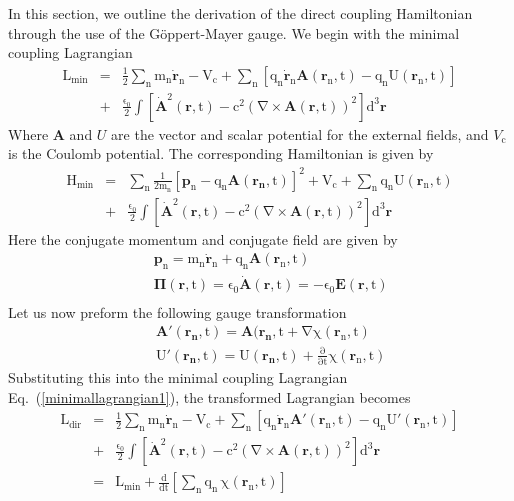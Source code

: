 In this section, we outline the derivation of the direct coupling Hamiltonian through the use of the G\"{o}ppert-Mayer gauge.  We begin with the minimal coupling Lagrangian
\begin{eqnarray}
\mathrm{L_{min}}&=&\mathrm{\frac{1}{2}\sum_n m_n\dot{\mathbf{r}}_n-V_c+\sum_n\left[q_n\dot{\mathbf{r}}_n\mathbf{A}(\mathbf{r}_n,t)-q_nU(\mathbf{r}_n,t)\right]} \nonumber \\
&+&\mathrm{\frac{\epsilon_0}{2}\int\left[\dot{\mathbf{A}}^2(\mathbf{r},t)-c^2\left(\nabla\times\mathbf{A}(\mathbf{r},t)\right)^2\right]d^3\mathbf{r}}
\label{minimallagrangian1}
\end{eqnarray}
Where $\mathbf{A}$ and $U$ are the vector and scalar potential for the external fields, and $V_{\mathrm{c}}$ is the Coulomb potential.
The corresponding Hamiltonian is given by
\begin{eqnarray}
\mathrm{H_{min}}&=&\mathrm{\sum_n \frac{1}{2m_n}\left[\mathbf{p}_n-q_n\mathbf{A}(\mathbf{r_n},t)\right]^2+V_{c}+\sum_nq_nU(\mathbf{r}_n,t)}\nonumber \\
&+&\mathrm{\frac{\epsilon_0}{2}\int\left[\dot{\mathbf{A}}^2(\mathbf{r},t)-c^2\left(\nabla\times\mathbf{A}(\mathbf{r},t)\right)^2\right]d^3\mathbf{r}}
\label{minimalhamiltonian1}
\end{eqnarray}
Here the conjugate momentum and conjugate field are given by
\begin{eqnarray}
&&\mathrm{\mathbf{p}_n=m_n\dot{\mathbf{r}}_n+q_n\mathbf{A}(\mathbf{r}_n,t)} \\
&&\mathrm{\mathbf{\Pi}(\mathbf{r},t)=\epsilon_0 \dot{\mathbf{A}}(\mathbf{r},t)=-\epsilon_0\mathbf{E}(\mathbf{r},t)}\\
\end{eqnarray}
Let us now preform the following gauge transformation
\begin{eqnarray}
&&\mathrm{\mathbf{A}'(\mathbf{r_n},t)=\mathbf{A}(\mathbf{r_n},t+\nabla\chi(\mathbf{r}_n,t)}  \\
&&\mathrm{U'(\mathbf{r_n},t)=U(\mathbf{r_n},t)+\frac{\partial}{\partial t}\chi(\mathbf{r}_n,t)}
\end{eqnarray}
Substituting this into the minimal coupling Lagrangian Eq.\ (\ref{minimallagrangian1}), the transformed Lagrangian becomes
\begin{eqnarray}
\mathrm{L_{dir}}&=&\mathrm{\frac{1}{2}\sum_n m_n\dot{\mathbf{r}}_n-V_c+\sum_n\left[q_n\dot{\mathbf{r}}_n\mathbf{A}'(\mathbf{r}_n,t)-q_nU'(\mathbf{r}_n,t)\right]} \nonumber \\
&+&\mathrm{\frac{\epsilon_0}{2}\int\left[\dot{\mathbf{A}}^2(\mathbf{r},t)-c^2\left(\nabla\times\mathbf{A}(\mathbf{r},t)\right)^2\right]d^3\mathbf{r}} \nonumber \\
&=&\mathrm{L_{min}+\frac{d}{dt}\left[\sum_n q_n\,\chi(\mathbf{r}_n,t)\right]}
\label{minimallagrangian2}
\end{eqnarray}
